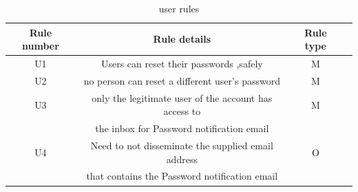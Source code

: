 \begin{table}[!htbp]         %
	\begin{center}
\begin{tabular}{|c|c|c|c|}
\hline 
 \textbf{ Rule number} & \textbf{Rule details} & \textbf{Rule type}\\ 
\hline  
 U1 & Users can reset their passwords ,safely & M\\ 
\hline
 U2 & no person  can reset a different user's password & M
 \\ 
\hline 
 U3 & only the legitimate user of the account has access to & M \\ & the inbox for Password notification email \\ 
\hline
U4 & Need to not disseminate the supplied  email address & O \\ & that contains the  Password notification email \\ 
\hline 
	\end{tabular}
	\end{center}
	\caption{ user rules }
\label{Userrules}
\end{table} 


